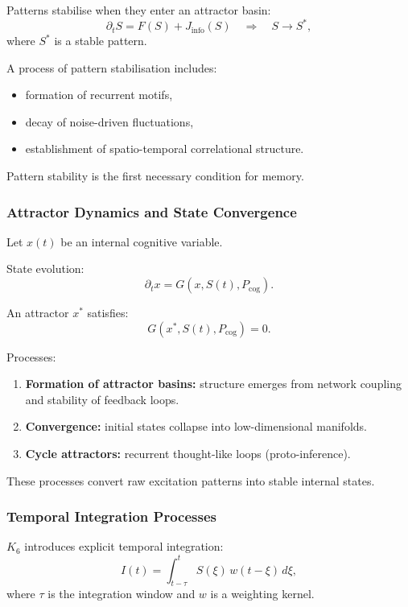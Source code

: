 Patterns stabilise when they enter an attractor basin:
\[
\partial_t S = F(S) + J_{\text{info}}(S) 
\quad\Rightarrow\quad
S \to S^\ast,
\]
where $S^\ast$ is a stable pattern.

A process of pattern stabilisation includes:
\begin{itemize}
    \item formation of recurrent motifs,
    \item decay of noise-driven fluctuations,
    \item establishment of spatio-temporal correlational structure.
\end{itemize}

Pattern stability is the first necessary condition for memory.

\subsubsection{Attractor Dynamics and State Convergence}

Let $x(t)$ be an internal cognitive variable.

State evolution:
\[
\partial_t x = G(x, S(t), P_{\text{cog}}).
\]

An attractor $x^\ast$ satisfies:
\[
G(x^\ast, S(t), P_{\text{cog}})=0.
\]

Processes:
\begin{enumerate}
    \item \textbf{Formation of attractor basins:}  
    structure emerges from network coupling and stability of feedback loops.
    \item \textbf{Convergence:}  
    initial states collapse into low-dimensional manifolds.
    \item \textbf{Cycle attractors:}  
    recurrent thought-like loops (proto-inference).
\end{enumerate}

These processes convert raw excitation patterns into stable internal states.

\subsubsection{Temporal Integration Processes}

$K_6$ introduces explicit temporal integration:
\[
I(t) = \int_{t-\tau}^{t} S(\xi)\, w(t-\xi)\,d\xi,
\]
where $\tau$ is the integration window and $w$ is a weighting kernel.

